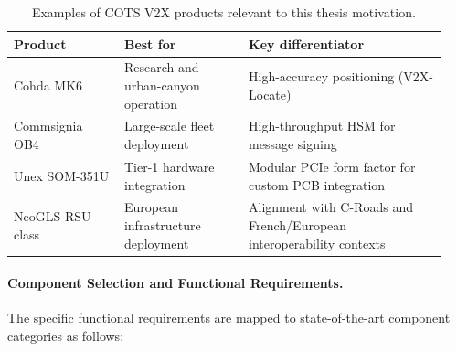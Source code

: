 \begin{table}[!ht]
    \centering
    \caption{Examples of COTS V2X products relevant to this thesis motivation.}
    \label{tab:ch6_cots_products}
    \renewcommand{\arraystretch}{1.12}
    \begin{tabular}{p{0.24\linewidth} p{0.27\linewidth} p{0.43\linewidth}}
        \hline
        \textbf{Product} & \textbf{Best for} & \textbf{Key differentiator} \\
        \hline
        Cohda MK6 & Research and urban-canyon operation & High-accuracy positioning (V2X-Locate)~\cite{cohda2025mk6} \\
        Commsignia OB4 & Large-scale fleet deployment & High-throughput HSM for message signing~\cite{commsignia2025ob4} \\
        Unex SOM-351U & Tier-1 hardware integration & Modular PCIe form factor for custom PCB integration~\cite{unex2024som} \\
        NeoGLS RSU class & European infrastructure deployment & Alignment with C-Roads and French/European interoperability contexts~\cite{croads2023interop} \\
        \hline
    \end{tabular}
\end{table}

\paragraph{Component Selection and Functional Requirements.}
The specific functional requirements are mapped to state-of-the-art component categories as follows:

